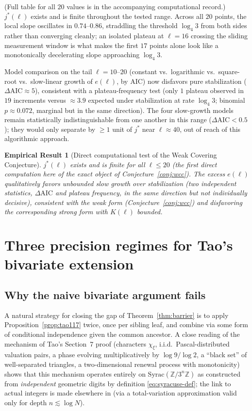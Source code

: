 \documentclass[11pt]{article}
\newtheorem{empirical}[theorem]{Empirical Result}
\theoremstyle{definition}
\theoremstyle{remark}
\begin{document}
(Full table for all $20$ values is in the accompanying computational
record.) $j^\ast(\ell)$ exists and is finite throughout the tested
range. Across all $20$ points, the local slope oscillates in
$0.74$--$0.86$, straddling the threshold $\log_4 3$ from both sides
rather than converging cleanly; an isolated plateau at $\ell=16$
crossing the sliding measurement window is what makes the first $17$
points alone look like a monotonically decelerating slope approaching
$\log_4 3$.

Model comparison on the tail $\ell=10$--$20$ (constant vs.\ logarithmic
vs.\ square-root vs.\ slow-linear growth of $e(\ell)$, by AIC) now
disfavors pure stabilization ($\Delta\mathrm{AIC}\approx 5$), consistent
with a plateau-frequency test (only $1$ plateau observed in $19$
increments versus $\approx 3.9$ expected under stabilization at rate
$\log_4 3$; binomial $p\approx 0.072$, marginal but in the same
direction). The four slow-growth models remain statistically
indistinguishable from one another in this range
($\Delta\mathrm{AIC}<0.5$); they would only separate by $\ge 1$ unit of
$j^\ast$ near $\ell\approx 40$, out of reach of this algorithmic
approach.

\begin{empirical}[Direct computational test of the Weak Covering
Conjecture]\label{thm:wcc}
$j^\ast(\ell)$ exists and is finite for all $\ell\le 20$ (the first
direct computation here of the exact object of
Conjecture~\ref{conj:wcc}). The excess $e(\ell)$ qualitatively favors
unbounded slow growth over stabilization (two independent statistics,
$\Delta\mathrm{AIC}$ and plateau frequency, in the same direction but
not individually decisive), consistent with the weak form
(Conjecture~\ref{conj:wcc}) and disfavoring the corresponding strong
form with $K(\ell)$ bounded.
\end{empirical}

\section{Three precision regimes for Tao's bivariate extension}
\label{sec:regimes}

\subsection{Why the naive bivariate argument fails}

A natural strategy for closing the gap of Theorem~\ref{thm:barrier} is
to apply Proposition~\ref{prop:tao117} twice, once per sibling leaf,
and combine via some form of conditional independence given the common
ancestor. A close reading of the mechanism of Tao's Section~7 proof
(characters $\chi_\xi$, i.i.d.\ Pascal-distributed valuation pairs, a
phase evolving multiplicatively by $\log 9/\log 2$, a ``black set'' of
well-separated triangles, a two-dimensional renewal process with
monotonicity) shows that this mechanism operates entirely on
$\mathrm{Syrac}(\mathbb{Z}/3^n\mathbb{Z})$ as constructed from
\emph{independent} geometric digits by definition
\eqref{eq:syracuse-def}; the link to actual integers is made elsewhere
in \cite{Tao2022} (via a total-variation approximation valid only for
depth $n\lesssim\log N$).
\end{document}
